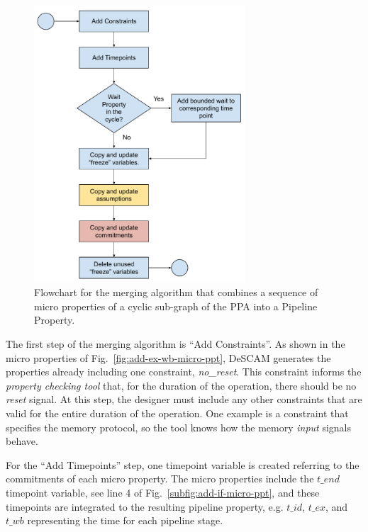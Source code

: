 \begin{figure}[htb!]
	\centering
	\includegraphics[width=0.7\textwidth]{images/algorithm.pdf}
	\caption{Flowchart for the merging algorithm that combines a sequence of micro properties of a cyclic sub-graph of the PPA into a Pipeline Property.}
	\label{fig:algorithm-flow}
\end{figure}

The first step of the merging algorithm is “Add Constraints”. As shown in the micro properties of Fig.~\ref{fig:add-ex-wb-micro-ppt}, DeSCAM generates the properties already including one constraint, \textit{no\_reset}. This constraint informs the \textit{property checking tool} that, for the duration of the operation, there should be no \textit{reset} signal. At this step, the designer must include any other constraints that are valid for the entire duration of the operation. One example is a constraint that specifies the memory protocol, so the tool knows how the memory \textit{input} signals behave.

For the “Add Timepoints” step, one timepoint variable is created referring to the commitments of each micro property. The micro properties include the $t\_end$ timepoint variable, see line 4 of Fig.~\ref{subfig:add-if-micro-ppt}, and these timepoints are integrated to the resulting pipeline property, e.g. $t\_id$, $t\_ex$, and $t\_wb$ representing the time for each pipeline stage.

